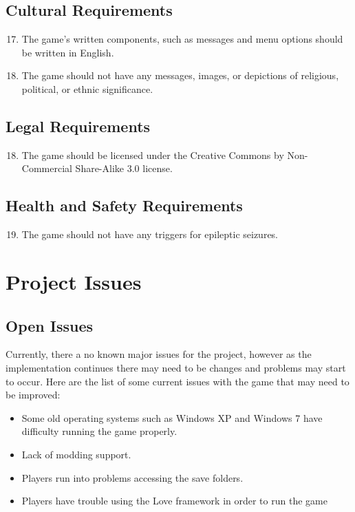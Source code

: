 \documentclass[12pt, titlepage]{article}
\begin{document}
\subsection{Cultural Requirements}
\begin{enumerate}
\setcounter{enumi}{16}
	\item The game's written components, such as messages and menu options should be written in English.
	\item The game should not have any messages, images, or depictions of religious, political, or ethnic significance.
\end{enumerate}

\subsection{Legal Requirements}
\begin{enumerate}
\setcounter{enumi}{17}
	\item The game should be licensed under the Creative Commons by Non-Commercial Share-Alike 3.0 license. 
\end{enumerate}

\subsection{Health and Safety Requirements}
\begin{enumerate}
\setcounter{enumi}{18}
	\item The game should not have any triggers for epileptic seizures.
\end{enumerate}

\section{Project Issues}

\subsection{Open Issues}
Currently, there a no known major issues for the project, however as the implementation continues there may need to be changes and problems may start to occur. 
Here are the list of some current issues with the game that may need to be improved:
\begin{itemize}
\item Some old operating systems such as Windows XP and Windows 7 have difficulty running the game properly.
\item Lack of modding support.
\item Players run into problems accessing the save folders.
\item Players have trouble using the Love framework in order to run the game
\end{itemize}
\end{document}
